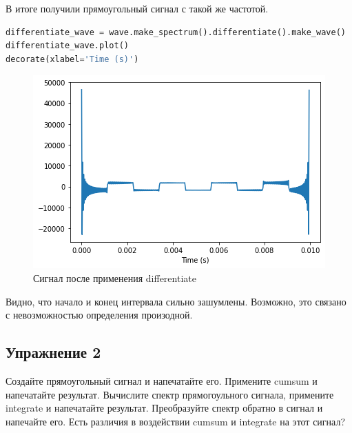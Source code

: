 В итоге получили прямоугольный сигнал с такой же частотой.

\begin{lstlisting}[language=Python]
differentiate_wave = wave.make_spectrum().differentiate().make_wave()
differentiate_wave.plot()
decorate(xlabel='Time (s)')
\end{lstlisting}
\begin{figure}[H]
	\begin{center}
		\includegraphics[scale=1]{fig/lab09/lab09_6_0.png}
		\caption{Сигнал после применения differentiate}
	\end{center}
\end{figure}

Видно, что начало и конец интервала сильно зашумлены. Возможно, это связано с невозможностью определения произодной.

\subsection{Упражнение 2}

Создайте прямоугольный сигнал и напечатайте его. Примените cumsum и напечатайте результат. Вычислите спектр прямогоульного сигнала, примените integrate и напечатайте результат. Преобразуйте спектр обратно в сигнал и напечайте его. Есть различия в воздействии cumsum и integrate на этот сигнал?

